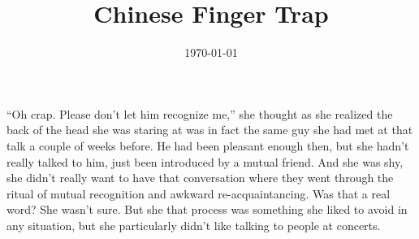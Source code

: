 \documentclass[letterpaper]{article}
\title{Chinese Finger Trap}
\author{}
\date{\today}
\begin{document}
\maketitle
\begin{multicols}{2}
%

``Oh crap. Please don't let him recognize me,'' she thought as she realized the back of the head she was staring at was in fact the same guy she had met at that talk a couple of weeks before.
He had been pleasant enough then, but she hadn't really talked to him, just been introduced by a mutual friend.
And she was shy, she didn't really want to have that conversation where they went through the ritual of mutual recognition and awkward re-acquaintancing. Was that a real word?
She wasn't sure. But she that process was something she liked to avoid in any situation, but she particularly didn't like talking to people at concerts.


\end{multicols}
\end{document}
